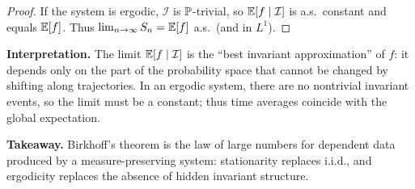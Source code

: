 \begin{proof}
\medskip
{}
If the system is ergodic, $\mathcal I$ is $\mathbb{P}$-trivial, so $\mathbb{E}[f\mid\mathcal I]$ is a.s.\ constant and equals $\mathbb{E}[f]$.
Thus $\lim_{n\to\infty}S_n=\mathbb{E}[f]$ a.s.\ (and in $L^1$).
\end{proof}


\noindent
\textbf{Interpretation.}
The limit \(\mathbb{E}[f\mid\mathcal{I}]\) is the ``best invariant approximation'' of \(f\): it depends only on the part of the
probability space that cannot be changed by shifting along trajectories.
In an ergodic system, there are no nontrivial invariant events, so the limit must be a constant; thus
time averages coincide with the global expectation.

\medskip

\noindent
\textbf{Takeaway.}
Birkhoff's theorem is the law of large numbers for dependent data produced by a measure-preserving system:
stationarity replaces i.i.d., and ergodicity replaces the absence of hidden invariant structure.


